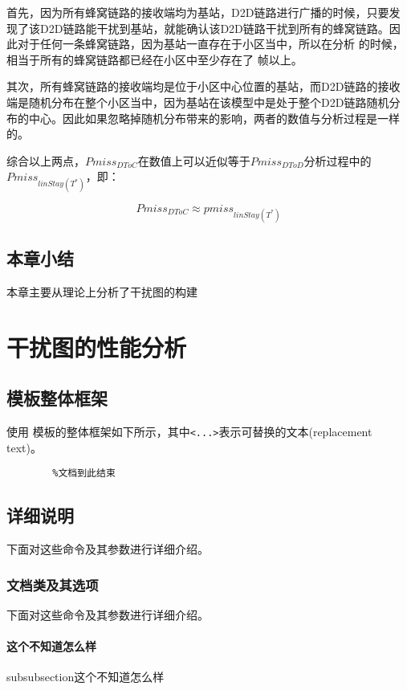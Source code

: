\documentclass[figurelist,tablelist,algorithmlist,nomlist,masters]{seuthesix}
\begin{document}
	首先，因为所有蜂窝链路的接收端均为基站，D2D链路进行广播的时候，只要发现了该D2D链路能干扰到基站，就能确认该D2D链路干扰到所有的蜂窝链路。因此对于任何一条蜂窝链路，因为基站一直存在于小区当中，所以在分析 的时候，相当于所有的蜂窝链路都已经在小区中至少存在了 帧以上。

	其次，所有蜂窝链路的接收端均是位于小区中心位置的基站，而D2D链路的接收端是随机分布在整个小区当中，因为基站在该模型中是处于整个D2D链路随机分布的中心。因此如果忽略掉随机分布带来的影响，两者的数值与分析过程是一样的。

	综合以上两点，$Pmis{s_{DToC}}$在数值上可以近似等于$Pmis{s_{DToD}}$分析过程中的$Pmis{s_{linStay({T^*})}}$，即：

	\begin{equation}\label{eq3.1}
		Pmis{s_{DToC}} \approx pmis{s_{linStay({T^*})}}
	\end{equation}

	\section{本章小结}
	本章主要从理论上分析了干扰图的构建



	\chapter{干扰图的性能分析}

	\section{模板整体框架}
	使用 \seuthesix 模板的整体框架如下所示，其中\verb+<...>+表示可替换的文本(replacement text)。
	{\color{magenta}
		\begin{verbatim}
		%文档到此结束
		\end{verbatim}
	}

	\section{详细说明}
	下面对这些命令及其参数进行详细介绍。
	\subsection{文档类及其选项}
	下面对这些命令及其参数进行详细介绍。
	\subsubsection{这个不知道怎么样}
	subsubsection{这个不知道怎么样}
\end{document}
